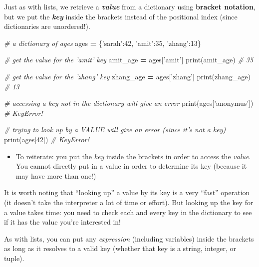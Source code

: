 \documentclass[]{book}
\newenvironment{Shaded}{\begin{snugshade}}{\end{snugshade}}
\newcommand{\DecValTok}[1]{\textcolor[rgb]{0.00,0.00,0.81}{#1}}
\newcommand{\StringTok}[1]{\textcolor[rgb]{0.31,0.60,0.02}{#1}}
\newcommand{\CommentTok}[1]{\textcolor[rgb]{0.56,0.35,0.01}{\textit{#1}}}
\newcommand{\OperatorTok}[1]{\textcolor[rgb]{0.81,0.36,0.00}{\textbf{#1}}}
\newcommand{\BuiltInTok}[1]{#1}
\newcommand{\NormalTok}[1]{#1}
\providecommand{\tightlist}{%
  \setlength{\itemsep}{0pt}\setlength{\parskip}{0pt}}
\begin{document}
Just as with lists, we retrieve a \textbf{\emph{value}} from a
dictionary using \textbf{bracket notation}, but we put the
\textbf{\emph{key}} inside the brackets instead of the positional index
(since dictionaries are unordered!).

\begin{Shaded}
\begin{Highlighting}[]
\CommentTok{# a dictionary of ages}
\NormalTok{ages }\OperatorTok{=}\NormalTok{ \{}\StringTok{'sarah'}\NormalTok{:}\DecValTok{42}\NormalTok{, }\StringTok{'amit'}\NormalTok{:}\DecValTok{35}\NormalTok{, }\StringTok{'zhang'}\NormalTok{:}\DecValTok{13}\NormalTok{\}}

\CommentTok{# get the value for the 'amit' key}
\NormalTok{amit_age }\OperatorTok{=}\NormalTok{ ages[}\StringTok{'amit'}\NormalTok{]}
\BuiltInTok{print}\NormalTok{(amit_age)  }\CommentTok{# 35}

\CommentTok{# get the value for the 'zhang' key}
\NormalTok{zhang_age }\OperatorTok{=}\NormalTok{ ages[}\StringTok{'zhang'}\NormalTok{]}
\BuiltInTok{print}\NormalTok{(zhang_age)  }\CommentTok{# 13}

\CommentTok{# accessing a key not in the dictionary will give an error}
\BuiltInTok{print}\NormalTok{(ages[}\StringTok{'anonymus'}\NormalTok{])  }\CommentTok{# KeyError!}

\CommentTok{# trying to look up by a VALUE will give an error (since it's not a key)}
\BuiltInTok{print}\NormalTok{(ages[}\DecValTok{42}\NormalTok{])  }\CommentTok{# KeyError!}
\end{Highlighting}
\end{Shaded}

\begin{itemize}
\tightlist
\item
  To reiterate: you put the \emph{key} inside the brackets in order to
  access the \emph{value}. You cannot directly put in a value in order
  to determine its key (because it may have more than one!)
\end{itemize}

It is worth noting that ``looking up'' a value by its key is a very
``fast'' operation (it doesn't take the interpreter a lot of time or
effort). But looking up the key for a value takes time: you need to
check each and every key in the dictionary to see if it has the value
you're interested in!

As with lists, you can put any \emph{expression} (including variables)
inside the brackets as long as it resolves to a valid key (whether that
key is a string, integer, or tuple).
\end{document}
